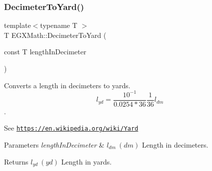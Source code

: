 \subsubsection{\texorpdfstring{Decimeter\+To\+Yard()}{DecimeterToYard()}}
{\footnotesize\ttfamily template$<$typename T $>$ \\
T E\+G\+X\+Math\+::\+Decimeter\+To\+Yard (\begin{DoxyParamCaption}\item[{const T}]{length\+In\+Decimeter }\end{DoxyParamCaption})}



Converts a length in decimeters to yards. \[ l_{yd}= \frac{10^{-1}}{0.0254 * 36} \frac{1}{36} l_{dm} \]. 

See \href{https://en.wikipedia.org/wiki/Yard}{\tt https\+://en.\+wikipedia.\+org/wiki/\+Yard} 
\begin{DoxyParams}{Parameters}
{\em length\+In\+Decimeter} & $ l_{dm}\ (dm)$ Length in decimeters. \\
\hline
\end{DoxyParams}
\begin{DoxyReturn}{Returns}
$ l_{yd}\ (yd)$ Length in yards. 
\end{DoxyReturn}
